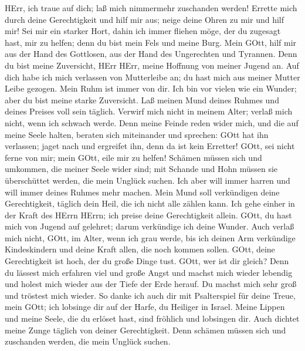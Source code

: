  HErr, ich traue auf dich; laß mich nimmermehr zuschanden
werden!  Errette mich durch deine Gerechtigkeit und hilf mir
aus; neige deine Ohren zu mir und hilf mir!  Sei mir ein
starker Hort, dahin ich immer fliehen möge, der du zugesagt hast, mir zu
helfen; denn du bist mein Fels und meine Burg.  Mein GOtt,
hilf mir aus der Hand des Gottlosen, aus der Hand des Ungerechten und
Tyrannen.  Denn du bist meine Zuversicht, HErr HErr, meine
Hoffnung von meiner Jugend an.  Auf dich habe ich mich
verlassen von Mutterleibe an; du hast mich aus meiner Mutter Leibe
gezogen. Mein Ruhm ist immer von dir.  Ich bin vor vielen
wie ein Wunder; aber du bist meine starke Zuversicht.  Laß
meinen Mund deines Ruhmes und deines Preises voll sein täglich.
 Verwirf mich nicht in meinem Alter; verlaß mich nicht, wenn
ich schwach werde.  Denn meine Feinde reden wider mich, und
die auf meine Seele halten, beraten sich miteinander  und
sprechen: GOtt hat ihn verlassen; jaget nach und ergreifet ihn, denn da
ist kein Erretter!  GOtt, sei nicht ferne von mir; mein
GOtt, eile mir zu helfen!  Schämen müssen sich und
umkommen, die meiner Seele wider sind; mit Schande und Hohn müssen sie
überschüttet werden, die mein Unglück suchen.  Ich aber
will immer harren und will immer deines Ruhmes mehr machen.
 Mein Mund soll verkündigen deine Gerechtigkeit, täglich
dein Heil, die ich nicht alle zählen kann.  Ich gehe einher
in der Kraft des HErrn HErrn; ich preise deine Gerechtigkeit allein.
 GOtt, du hast mich von Jugend auf gelehret; darum
verkündige ich deine Wunder.  Auch verlaß mich nicht, GOtt,
im Alter, wenn ich grau werde, bis ich deinen Arm verkündige
Kindeskindern und deine Kraft allen, die noch kommen sollen.
 GOtt, deine Gerechtigkeit ist hoch, der du große Dinge
tust. GOtt, wer ist dir gleich?  Denn du lässest mich
erfahren viel und große Angst und machst mich wieder lebendig und holest
mich wieder aus der Tiefe der Erde herauf.  Du machst mich
sehr groß und tröstest mich wieder.  So danke ich auch dir
mit Psalterspiel für deine Treue, mein GOtt; ich lobsinge dir auf der
Harfe, du Heiliger in Israel.  Meine Lippen und meine
Seele, die du erlöset hast, sind fröhlich und lobsingen dir.
 Auch dichtet meine Zunge täglich von deiner Gerechtigkeit.
Denn schämen müssen sich und zuschanden werden, die mein Unglück suchen.

